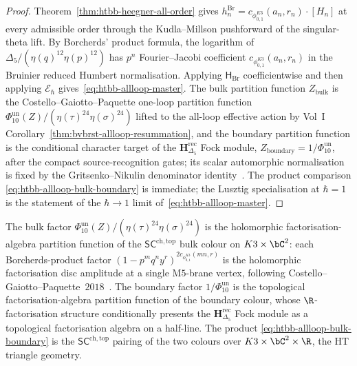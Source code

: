 \begin{proof}
Theorem~\ref{thm:htbb-heegner-all-order} gives
\(h_n^{\mathrm{Br}} = c_{\phi_{0,1}^{K3}}(a_n,r_n)\cdot[H_n]\) at every
admissible order through the Kudla--Millson pushforward of the
singular-theta lift. By Borcherds' product formula, the logarithm of
\(\Delta_5/(\eta(q)^{12}\eta(p)^{12})\) has $p^n$ Fourier--Jacobi
coefficient \(c_{\phi_{0,1}^{K3}}(a_n,r_n)\) in the Bruinier reduced Humbert
normalisation. Applying $\mathsf H_{\mathrm{Br}}$ coefficientwise and
then applying \(\mathscr E_\hbar\) gives~\eqref{eq:htbb-allloop-master}. The
bulk partition function
$Z_{\mathrm{bulk}}$ is the Costello--Gaiotto--Paquette one-loop
partition function~\cite[\S 7]{CostelloGaiottoPaquette2018}
\(\Phi_{10}^{\mathrm{un}}(Z)/(\eta(\tau)^{24}\eta(\sigma)^{24})\)
lifted to the all-loop effective action by
Vol~I Corollary~\ref{thm:bvbrst-allloop-resummation}, and the
boundary partition function is the conditional character target of the
$\mathbf{H}_{\Delta_5}^{\mathrm{rec}}$ Fock module,
$Z_{\mathrm{boundary}} = 1/\Phi_{10}^{\mathrm{un}}$, after the compact
source-recognition gates; its scalar automorphic normalisation is fixed
by the Gritsenko--Nikulin denominator
identity~\cite[\S 1]{GritsenkoNikulin1998}. The product comparison
\eqref{eq:htbb-allloop-bulk-boundary} is immediate; the Lusztig
specialisation at $\hbar = 1$ is the statement of the $\hbar\to 1$
limit of~\eqref{eq:htbb-allloop-master}.
\end{proof}

\begin{remark}
\label{rem:htbb-allloop-sc-factorisation}
The bulk factor
\(\Phi_{10}^{\mathrm{un}}(Z)/(\eta(\tau)^{24}\eta(\sigma)^{24})\)
is the holomorphic
factorisation-algebra partition function of the
$\mathsf{SC}^{\mathrm{ch,top}}$ bulk colour on $K3\times\bC^2$: each
Borcherds-product factor \((1 - p^mq^ny^r)^{2c_{\phi_{0,1}^{K3}}(mn,r)}\)
is the holomorphic factorisation disc amplitude at a single
M$5$-brane vertex, following
Costello--Gaiotto--Paquette~$2018$~\cite[\S 6]{CostelloGaiottoPaquette2018}.
The boundary factor $1/\Phi_{10}^{\mathrm{un}}$ is the topological
factorisation-algebra partition function of the boundary colour,
whose $\R$-factorisation structure conditionally presents the
$\mathbf{H}_{\Delta_5}^{\mathrm{rec}}$ Fock module as a topological
factorisation algebra on a half-line. The product
\eqref{eq:htbb-allloop-bulk-boundary} is the
$\mathsf{SC}^{\mathrm{ch,top}}$ pairing of the two colours over
$K3\times\bC^2\times\R$, the HT triangle geometry.
\end{remark}


